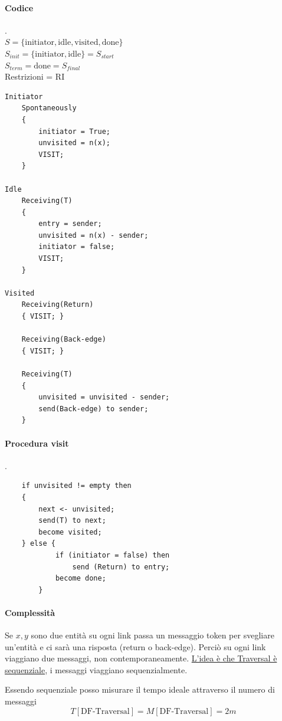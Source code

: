 \paragraph{Codice}
.\\$S = \{\text{initiator}, \text{idle}, \text{visited}, \text{done}\}$\\
$S_{init} = \{\text{initiator}, \text{idle}\} = S_{start}$\\
$S_{term} = \text{done} = S_{final} $\\
Restrizioni = RI

\begin{lstlisting}
Initiator
    Spontaneously
    {
        initiator = True;
        unvisited = n(x);
        VISIT;
    }

Idle
    Receiving(T)
    {
        entry = sender;
        unvisited = n(x) - sender;
        initiator = false;
        VISIT;
    }

Visited 
    Receiving(Return)
    { VISIT; }
    
    Receiving(Back-edge)
    { VISIT; }

    Receiving(T)
    {
        unvisited = unvisited - sender;
        send(Back-edge) to sender;
    }
\end{lstlisting}

\paragraph{Procedura visit}.
\begin{lstlisting}
    if unvisited != empty then
    {
        next <- unvisited;
        send(T) to next;
        become visited;
    } else {
            if (initiator = false) then
                send (Return) to entry;
            become done;
        }
\end{lstlisting}

\paragraph{Complessità}
Se $x,y$ sono due entità su ogni link passa un messaggio token per svegliare un'entità e ci sarà una risposta (return o back-edge). Perciò su ogni link viaggiano due messaggi, non contemporaneamente. \uline{L'idea è che Traversal è sequenziale}, i messaggi viaggiano sequenzialmente.

Essendo sequenziale posso misurare il tempo ideale attraverso il numero di messaggi
$$T[\text{DF-Traversal}] = M[\text{DF-Traversal}] = 2m$$

